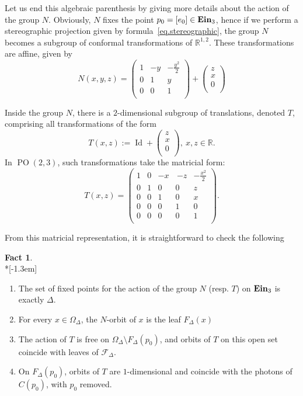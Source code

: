 \documentclass[11pt]{article}
\theoremstyle{definition}
\numberwithin{equation}{section}
\numberwithin{figure}{section}
\numberwithin{table}{section}
\newtheorem{fact}[theo]{Fact} }
\DeclareMathOperator{\ein}{{\bf Ein}_3}
\DeclareMathOperator{\Id}{Id}
\newcommand{\calfd}{{{\mathcal{F}}}_{\Delta}}
\newcommand*\RR{\mathbb{R}}
\DeclareMathOperator{\POop}{PO}
\newcommand{\PO}{{\POop(2,3)}}
\begin{document}
Let us end this algebraic parenthesis by giving more details about the action of the group $N$. Obviously, $N$ fixes the point $p_0=[e_0] \in \ein$, hence if we perform a stereographic projection given by formula~\eqref{eq.stereographic}, the group $N$ becomes a subgroup of conformal transformations of $\RR^{1,2}$. These transformations are affine, given by
\begin{equation}\label{eq.formuleaffine}
N(x,y,z)=
\begin{pmatrix}
1&-y&-\frac{y^2}{2}\\ 0&1&y\\0&0&1\\
\end{pmatrix} + 
\begin{pmatrix} z\\ x\\ 0 \\
\end{pmatrix}
\end{equation}

Inside the group $N$, there is a $2$-dimensional subgroup of translations, denoted $T$, comprising all transformations of the form
\[
T(x,z):=\Id + 
\begin{pmatrix} z\\ x\\ 0 \\
\end{pmatrix}, \ x,z \in \RR.
\]
In $\PO$, such transformations take the matricial form:
\[
T(x,z)=
\begin{pmatrix}
1&0&-x&\, {-z}& -\frac{x^2}{2}\\
0&1&0&0&z\\
0&0&1&0&x\\
0&0&0&1&0\\
0&0&0&0&1\\
\end{pmatrix}.
\]

From this matricial representation, it is straightforward to check the following

\begin{fact}\label{fact.action}\ \\*[-1.3em]
\begin{enumerate}
\item \label{7.2.1} The set of fixed points for the action of the group $N$ (resp. $T$) on $\ein$ is exactly $\Delta$.
\item \label{7.2.2} For every $x \in \Omega_{\Delta}$, the $N$-orbit of $x$ is the leaf $F_{\Delta}(x)$
\item \label{7.2.3} The action of $T$ is free on $\Omega_{\Delta} \setminus F_{\Delta}(p_0)$, and orbits of $T$ on this open set coincide with leaves of $\calfd$.
\item \label{7.2.4} On $ F_{\Delta}(p_0)$, orbits of $T$ are $1$-dimensional and coincide with the photons of $C(p_0)$, with $p_0$ removed.
\end{enumerate}
\end{fact}
\end{document}
